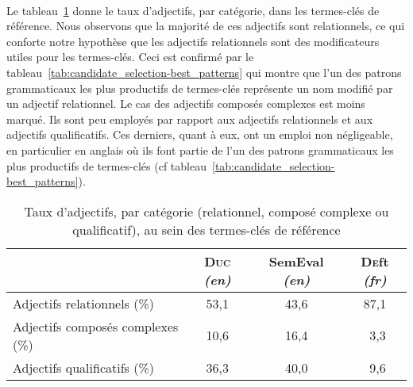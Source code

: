       ~\\Le tableau~\ref{tab:candidate_selection-adjective_categories} donne le
      taux d'adjectifs, par catégorie, dans les termes-clés de référence. Nous
      observons que la majorité de ces adjectifs sont relationnels, ce qui
      conforte notre hypothèse que les adjectifs relationnels sont des
      modificateurs utiles pour les termes-clés. Ceci est confirmé par le
      tableau~\ref{tab:candidate_selection-best_patterns} qui montre que l'un
      des patrons grammaticaux les plus productifs de termes-clés représente un
      nom modifié par un adjectif relationnel. Le cas des adjectifs composés
      complexes est moins marqué. Ils sont peu employés par rapport aux
      adjectifs relationnels et aux adjectifs qualificatifs. Ces derniers, quant
      à eux, ont un emploi non négligeable, en particulier en anglais où ils
      font partie de l'un des patrons grammaticaux les plus productifs de
      termes-clés (cf tableau~\ref{tab:candidate_selection-best_patterns}).
      \begin{table}[!ht]
        \centering
          \begin{tabular}{l|ccc}
            \toprule
            & \textbf{\textsc{Duc}} \textit{(en)} & \textbf{SemEval} \textit{(en)} & \textbf{\textsc{De}ft} \textit{(fr)}\\
            \hline
            Adjectifs relationnels \hfill(\%) & 53,1 & 43,6 & 87,1\\
            Adjectifs composés complexes \hfill(\%) & 10,6 & 16,4 & $~~$3,3\\
            Adjectifs qualificatifs \hfill(\%) & 36,3 & 40,0 & $~~$9,6\\
            \bottomrule
        \end{tabular}
        \caption{Taux d'adjectifs, par catégorie (relationnel, composé complexe
                 ou qualificatif), au sein des termes-clés de référence}
                 \label{tab:candidate_selection-adjective_categories}
      \end{table}

